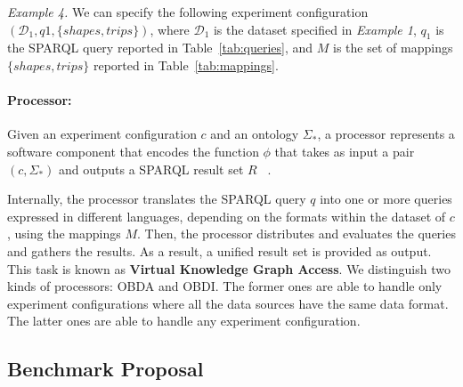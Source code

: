 \textit{Example 4.} We can specify the following experiment configuration $(\mathcal{D}_{1}, q1, \{shapes, trips\})$, where $\mathcal{D}_{1}$ is the data\-set specified in \textit{Example 1}, $q_1$ is the SPARQL query reported in Table~\ref{tab:queries}, 
and $M$ is the set of mappings $\{shapes, trips\}$  reported in Table~\ref{tab:mappings}.

\paragraph{\textbf{Processor:}} Given an experiment configuration $c$ and an ontology $\Sigma_*$, a processor represents a software component that encodes the function $\phi$ that takes as input a pair  $(c,\Sigma_*)$ and outputs a SPARQL result set $R$ ~\citep{w3c2013sparql}. 

Internally, the processor translates the SPARQL query $q$ into one or more queries expressed in different languages, depending on the formats within the dataset of $c$, using the mappings $M$. Then, the processor distributes and evaluates the queries and gathers the results. As a result, a unified result set is provided as output. This task is known as \textbf{Virtual Knowledge Graph Access}. We distinguish two kinds of processors: OBDA and OBDI. The former ones are able to handle only experiment configurations where all the data sources have the same data format. The latter ones are able to handle any experiment configuration.



\subsection{Benchmark Proposal}

